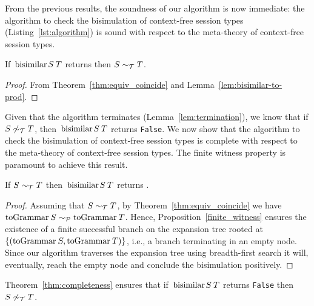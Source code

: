 From the previous results, the soundness of our algorithm is now
immediate: the algorithm to check the bisimulation of context-free
session types (Listing~\ref{lst:algorithm}) is sound with respect to
the meta-theory of context-free session types.

\begin{theorem}[Soundness]
\label{thm:soundness}
  If $\bisimf ST$ returns  then $S\sim_\mathcal T T$.
\end{theorem}
%
\begin{proof}
  From Theorem~\ref{thm:equiv_coincide} and
  Lemma~\ref{lem:bisimilar-to-prod}.
\end{proof}

 
Given that the algorithm terminates (Lemma~\ref{lem:termination}), we
know that if $S\not\sim_\mathcal T T$, then $\bisimf ST$ returns
\lstinline|False|.
%
We now show that the algorithm to check the bisimulation of context-free session 
types is complete with respect to the meta-theory of context-free session
types. The finite witness property is paramount to achieve this result.

\begin{theorem}[Completeness]
\label{thm:completeness}
  If $S \sim_\mathcal T T$ then $\bisimf S T$ returns
  .
\end{theorem}
%
\begin{proof}
  Assuming that $S \sim_\mathcal T T$, by Theorem~\ref{thm:equiv_coincide}
  we have $\toGrammarf{S} \ProdEquiv \toGrammarf{T} $.  Hence, Proposition~\ref{finite_witness}
  ensures the existence of a finite successful branch on the
  expansion tree rooted at $\{(\toGrammarf{S},\toGrammarf{T})\}$, i.e., a branch
  terminating in an empty node.  Since our algorithm traverses the
  expansion tree using breadth-first search it will, eventually, reach
  the empty node and conclude the bisimulation positively.
\end{proof}

Theorem~\ref{thm:completeness} ensures that if $\bisimf S T$ returns
  \lstinline|False| then $S \not\sim_\mathcal T T$.


